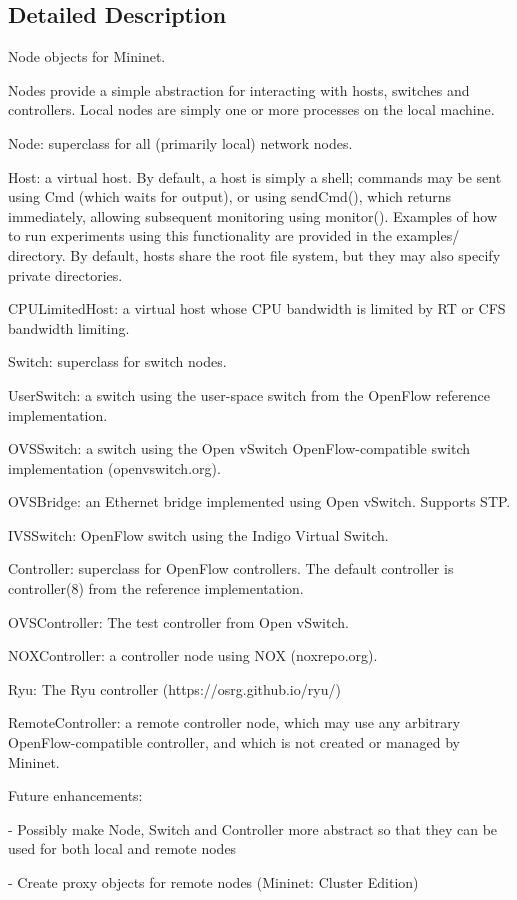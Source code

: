 \subsection{Detailed Description}
\begin{DoxyVerb}Node objects for Mininet.

Nodes provide a simple abstraction for interacting with hosts, switches
and controllers. Local nodes are simply one or more processes on the local
machine.

Node: superclass for all (primarily local) network nodes.

Host: a virtual host. By default, a host is simply a shell; commands
    may be sent using Cmd (which waits for output), or using sendCmd(),
    which returns immediately, allowing subsequent monitoring using
    monitor(). Examples of how to run experiments using this
    functionality are provided in the examples/ directory. By default,
    hosts share the root file system, but they may also specify private
    directories.

CPULimitedHost: a virtual host whose CPU bandwidth is limited by
    RT or CFS bandwidth limiting.

Switch: superclass for switch nodes.

UserSwitch: a switch using the user-space switch from the OpenFlow
    reference implementation.

OVSSwitch: a switch using the Open vSwitch OpenFlow-compatible switch
    implementation (openvswitch.org).

OVSBridge: an Ethernet bridge implemented using Open vSwitch.
    Supports STP.

IVSSwitch: OpenFlow switch using the Indigo Virtual Switch.

Controller: superclass for OpenFlow controllers. The default controller
    is controller(8) from the reference implementation.

OVSController: The test controller from Open vSwitch.

NOXController: a controller node using NOX (noxrepo.org).

Ryu: The Ryu controller (https://osrg.github.io/ryu/)

RemoteController: a remote controller node, which may use any
    arbitrary OpenFlow-compatible controller, and which is not
    created or managed by Mininet.

Future enhancements:

- Possibly make Node, Switch and Controller more abstract so that
  they can be used for both local and remote nodes

- Create proxy objects for remote nodes (Mininet: Cluster Edition)
\end{DoxyVerb}
 